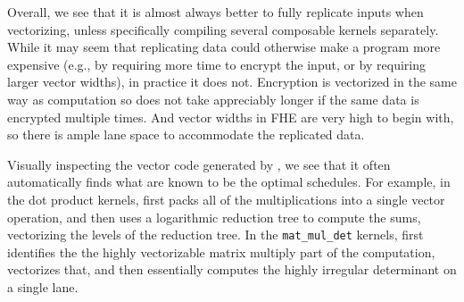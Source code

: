 
Overall, we see that it is almost always better to fully replicate inputs when vectorizing, unless specifically compiling several composable kernels separately. While it may seem that replicating data could otherwise make a program more expensive (e.g., by requiring more time to encrypt the input, or by requiring larger vector widths), in practice it does not. Encryption is vectorized in the same way as computation so does not take appreciably longer if the same data is encrypted multiple times. And vector widths in FHE are very high to begin with, so there is ample lane space to accommodate the replicated data.

Visually inspecting the vector code generated by \system, we see that it often automatically finds what are known to be the optimal schedules.
For example, in the dot product kernels, \system first packs all of the multiplications into a single vector operation, and then uses a logarithmic reduction tree to compute the sums, vectorizing the levels of the reduction tree.
In the \texttt{mat\_mul\_det} kernels, \system first identifies the the highly vectorizable matrix multiply part of the computation, vectorizes that, and then essentially computes the highly irregular determinant on a single lane.


